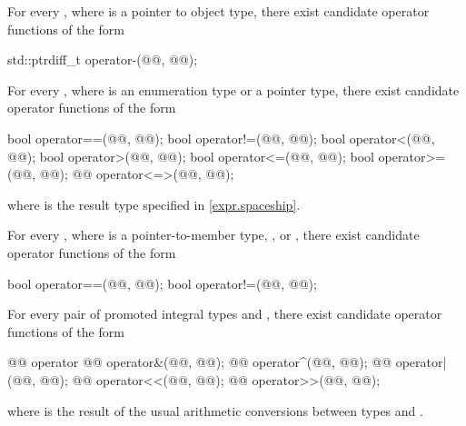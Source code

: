 \pnum
For every
,
where
is a pointer to object type,
there exist candidate operator functions of the form
\begin{codeblock}
std::ptrdiff_t   operator-(@@, @@);
\end{codeblock}

\pnum
For every , where  is an enumeration type or a pointer type,
there exist candidate operator functions of the form
\begin{codeblock}
bool    operator==(@@, @@);
bool    operator!=(@@, @@);
bool    operator<(@@, @@);
bool    operator>(@@, @@);
bool    operator<=(@@, @@);
bool    operator>=(@@, @@);
@@       operator<=>(@@, @@);
\end{codeblock}
where  is the result type specified in \ref{expr.spaceship}.

\pnum
For every , where 
is a pointer-to-member type, , or ,
there exist candidate operator functions of the form
\begin{codeblock}
bool operator==(@@, @@);
bool operator!=(@@, @@);
\end{codeblock}

\pnum
For every pair of promoted integral types
and
,
there exist candidate operator functions of the form
\begin{codeblock}
@@      operator%
@@      operator&(@@, @@);
@@      operator^(@@, @@);
@@      operator|(@@, @@);
@@       operator<<(@@, @@);
@@       operator>>(@@, @@);
\end{codeblock}
where
is the result of the usual arithmetic conversions between types
and
.

